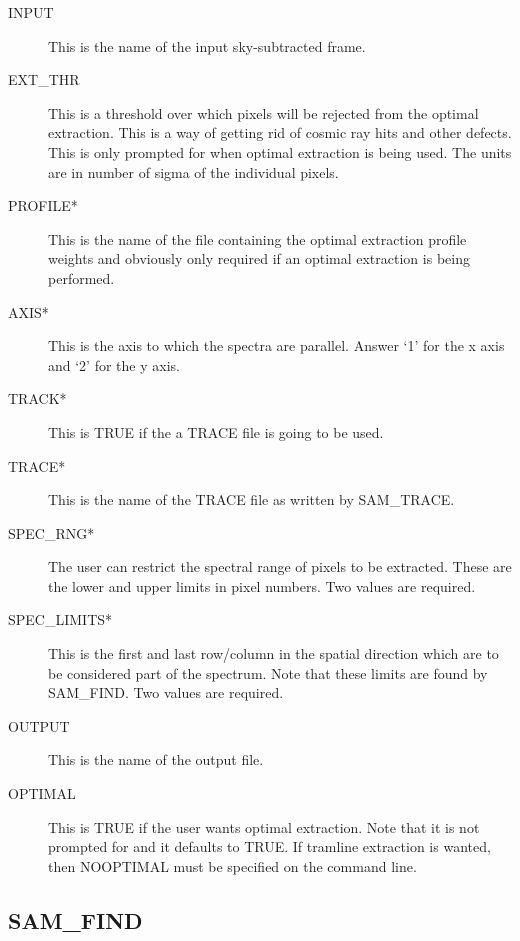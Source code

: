 \begin{description}
\begin{description}

\item[INPUT]  This is the name of the input sky-subtracted frame.

\item[EXT\_THR] This is a threshold over which pixels will be rejected from
the optimal extraction.  This is a way of getting rid of cosmic ray hits and
other defects.  This is only prompted for when optimal extraction is being
used.  The units are in number of sigma of the individual pixels.

\item[PROFILE*] This is the name of the file containing the optimal extraction
profile weights and obviously only required if an optimal extraction is being
performed.

\item[AXIS*] This is the axis to which the spectra are parallel.  Answer `1'
for the x axis and `2' for the y axis.

\item[TRACK*] This is TRUE if the a TRACE file is going to be used.

\item[TRACE*] This is the name of the TRACE file as written by SAM\_TRACE.

\item[SPEC\_RNG*] The user can restrict the spectral range of pixels to be
extracted. These are the lower and upper limits in pixel numbers.  Two values
are required.

\item[SPEC\_LIMITS*] This is the first and last row/column in the spatial
direction which are to be considered part of the spectrum.  Note that these
limits are found by SAM\_FIND. Two values are required.

\item[OUTPUT] This is the name of the output file.

\item[OPTIMAL]  This is TRUE if the user wants optimal extraction.  Note that
it is not prompted for and it defaults to TRUE.  If tramline extraction is
wanted, then NOOPTIMAL must be specified on the command line.

\end{description}
\end{description}

\subsection{SAM\_FIND}


